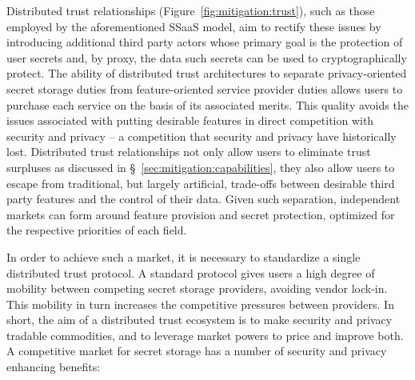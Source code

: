 Distributed trust relationships (Figure~\ref{fig:mitigation:trust}),
such as those employed by the aforementioned SSaaS model, aim to
rectify these issues by introducing additional third party actors
whose primary goal is the protection of user secrets and, by proxy,
the data such secrets can be used to cryptographically protect. The
ability of distributed trust architectures to separate
privacy-oriented secret storage duties from feature-oriented service
provider duties allows users to purchase each service on the basis of
its associated merits. This quality avoids the issues associated with
putting desirable features in direct competition with security and
privacy -- a competition that security and privacy have historically
lost. Distributed trust relationships not only allow users to
eliminate trust surpluses as discussed in
\S~\ref{sec:mitigation:capabilities}, they also allow users to escape
from traditional, but largely artificial, trade-offs between desirable
third party features and the control of their data. Given such
separation, independent markets can form around feature provision and
secret protection, optimized for the respective priorities of each
field.

In order to achieve such a market, it is necessary to standardize a
single distributed trust protocol. A standard protocol gives users a
high degree of mobility between competing secret storage providers,
avoiding vendor lock-in. This mobility in turn increases the
competitive pressures between providers. In short, the aim of a
distributed trust ecosystem is to make security and privacy tradable
commodities, and to leverage market powers to price and improve
both. A competitive market for secret storage has a number of security
and privacy enhancing benefits:

